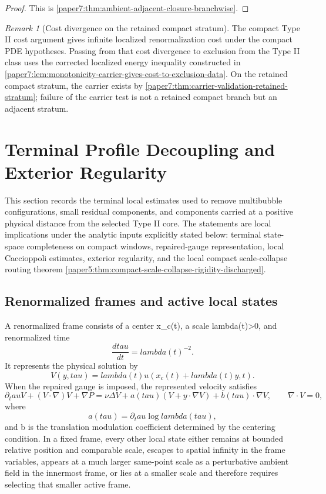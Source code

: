 \documentclass[11pt]{amsart}
\def\({}%
\def\){}%
\def\tau{tau}%
\def\lambda{lambda}%
\theoremstyle{plain}
\theoremstyle{definition}
\theoremstyle{remark}
\newtheorem{remark}[remark]{Remark}
\begin{document}
\begin{proof}
This is \cref{paper7:thm:ambient-adjacent-closure-branchwise}.
\end{proof}

\begin{remark}[Cost divergence on the retained compact stratum]
The compact Type II cost argument gives infinite localized renormalization cost
under the compact PDE hypotheses.  Passing from that cost divergence to
exclusion from the Type II class uses the corrected localized energy inequality
constructed in
\cref{paper7:lem:monotonicity-carrier-gives-cost-to-exclusion-data}.  On the
retained compact stratum, the carrier exists by
\cref{paper7:thm:carrier-validation-retained-stratum}; failure of the carrier
test is not a retained compact branch but an adjacent stratum.
\end{remark}

\clearpage
\section{Terminal Profile Decoupling and Exterior Regularity}
\label{sec:terminal-profile-decoupling-exterior}

This section records the terminal local estimates used to remove multibubble
configurations, small residual components, and components carried at a positive
physical distance from the selected Type II core.  The statements are
local implications under the analytic inputs explicitly stated below: terminal
state-space completeness on compact windows, repaired-gauge representation,
local Caccioppoli estimates, exterior regularity, and the local compact
scale-collapse routing theorem
\cref{paper5:thm:compact-scale-collapse-rigidity-discharged}.

\subsection{Renormalized frames and active local states}

A renormalized frame consists of a center \(x_c(t)\), a scale
\(\lambda(t)>0\), and renormalized time
\[
  \frac{d\tau}{dt}=\lambda(t)^{-2}.
\]
It represents the physical solution by
\[
  V(y,\tau)=\lambda(t)u(x_c(t)+\lambda(t)y,t).
\]
When the repaired gauge is imposed, the represented velocity satisfies
\[
  \partial_\tau V+(V\cdot\nabla)V+\nabla P
  =
  \nu\Delta V
  +a(\tau)(V+y\cdot\nabla V)
  +b(\tau)\cdot\nabla V,
  \qquad \nabla\cdot V=0,
\]
where
\[
  a(\tau)=\partial_\tau\log\lambda(\tau),
\]
and \(b\) is the translation modulation coefficient determined by the
centering condition.  In a fixed frame, every other local state either remains
at bounded relative position and comparable scale, escapes to spatial infinity
in the frame variables, appears at a much larger same-point scale as a
perturbative ambient field in the innermost frame, or lies at a smaller scale
and therefore requires selecting that smaller active frame.
\end{document}

